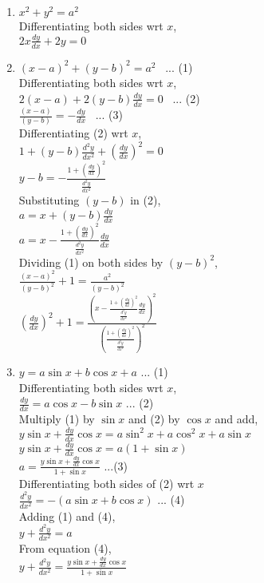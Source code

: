 \documentclass[a4paper]{article}
\begin{document}
\begin{enumerate}
\begin{enumerate}
\item{$x^2+y^2=a^2$
\\Differentiating both sides wrt $x$,
\\$2x\frac{dy}{dx}+2y=0$
}

\item{$(x-a)^2+(y-b)^2=a^2$ \ ... (1)
\\Differentiating both sides wrt $x$,
\\$2(x-a)+2(y-b)\frac{dy}{dx}=0$ \ ... (2)
\\$\frac{(x-a)}{(y-b)} = -\frac{dy}{dx}$ \ ... (3)
\\Differentiating (2) wrt $x$,
\\$1+(y-b)\frac{d^2y}{dx^2}+(\frac{dy}{dx})^2=0$
\\$y-b=-\frac{1+(\frac{dy}{dx})^2}{\frac{d^2y}{dx^2}}$
\\Substituting $(y-b)$ in (2),
\\$a=x+(y-b)\frac{dy}{dx}$
\\$a=x-\frac{1+(\frac{dy}{dx})^2}{\frac{d^2y}{dx^2}}\frac{dy}{dx}$
\\Dividing (1) on both sides by $(y-b)^2$,
\\$\frac{(x-a)^2}{(y-b)^2} +1 = \frac{a^2}{(y-b)^2}$
\\$(\frac{dy}{dx})^2 +1=\frac{(x-\frac{1+(\frac{dy}{dx})^2}{\frac{d^2y}{dx^2}}\frac{dy}{dx})^2}{(\frac{1+(\frac{dy}{dx})^2}{\frac{d^2y}{dx^2}})^2}$
}

\item{$y=a\sin x + b \cos x +a$ ... (1)
\\Differentiating both sides wrt $x$,
\\$\frac{dy}{dx}=a\cos x - b\sin x$ ... (2)
\\Multiply (1) by $\sin x$ and (2) by $\cos x$ and add,
\\$y\sin x+\frac{dy}{dx}\cos x = a\sin ^2 x + a \cos ^2 x +a\sin x$
\\$y\sin x+\frac{dy}{dx}\cos x = a(1+\sin x)$
\\$a=\frac{y\sin x+\frac{dy}{dx}\cos x}{1+\sin x}$ ...(3)
\\Differentiating both sides of (2) wrt $x$
\\$\frac{d^2y}{dx^2}=-(a\sin x + b\cos x)$ ... (4)
\\Adding (1) and (4),
\\$y+\frac{d^2y}{dx^2}=a$
\\From equation (4),
\\$y+\frac{d^2y}{dx^2}=\frac{y\sin x+\frac{dy}{dx}\cos x}{1+\sin x}$
}


\end{enumerate}
\end{enumerate}
\end{document}
